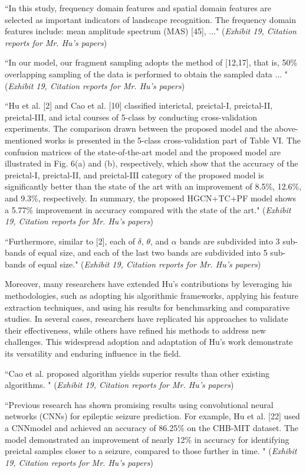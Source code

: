 \documentclass{article}
\begin{document}
“In this study, frequency domain features and spatial domain features are selected as important indicators of landscape recognition. The frequency domain features include: mean amplitude spectrum (MAS) [45], ..." ({\it Exhibit 19, Citation reports for Mr. Hu’s papers})

“In our model, our fragment sampling adopts the method of [12,17], that is, 50\% overlapping sampling of the data is performed to obtain the sampled data ... " ({\it Exhibit 19, Citation reports for Mr. Hu’s papers})

“Hu et al. [2] and Cao et al. [10] classified interictal, preictal-I, preictal-II, preictal-III, and ictal courses of 5-class by conducting cross-validation experiments. The comparison drawn between the proposed model and the above-mentioned works is presented in the 5-class cross-validation part of Table VI. The confusion matrices of the state-of-the-art model and the proposed model are illustrated in Fig. 6(a) and (b), respectively, which show that the accuracy of the preictal-I, preictal-II, and preictal-III category of the proposed model is significantly better than the state of the art with an improvement of 8.5\%, 12.6\%, and 9.3\%, respectively. In summary, the proposed HGCN+TC+PF model shows a 5.77\% improvement in accuracy compared with the state of the art." ({\it Exhibit 19, Citation reports for Mr. Hu’s papers})

“Furthermore, similar to [2], each of $\delta$, $\theta$, and $\alpha$ bands are subdivided into 3 sub-bands of equal size, and each of the last two bands are subdivided into 5 sub-bands of equal size." ({\it Exhibit 19, Citation reports for Mr. Hu’s papers})


Moreover, many researchers have extended Hu’s contributions by leveraging his methodologies, such as adopting his algorithmic frameworks, applying his feature extraction techniques, and using his results for benchmarking and comparative studies. In several cases, researchers have replicated his approaches to validate their effectiveness, while others have refined his methods to address new challenges. This widespread adoption and adaptation of Hu’s work demonstrate its versatility and enduring influence in the field.

“Cao et al. proposed algorithm yields superior results than other existing algorithms. " ({\it Exhibit 19, Citation reports for Mr. Hu’s papers})


“Previous research has shown promising results using convolutional neural networks (CNNs) for epileptic seizure prediction. For example, Hu et al. [22] used a CNNmodel and  achieved an accuracy of 86.25\% on the CHB-MIT dataset. The model demonstrated an improvement of nearly 12\% in accuracy for identifying preictal samples closer to a seizure, compared to those further in time. " ({\it Exhibit 19, Citation reports for Mr. Hu’s papers})
\end{document}
